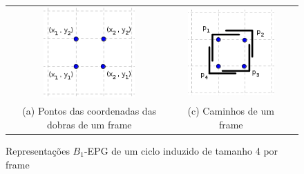 \begin{figure}[htb]
  \centering
  \begin{tabular}{c c c c c }
    \includegraphics[width=3.5cm]{./img/dispositionFrameInGrid.png}    
    & &
 \includegraphics[width=3.5cm]{./img/frameInGrid.png} \\%
    {\footnotesize (a) Pontos das coordenadas das dobras de um frame}  
    & & {\footnotesize (c) Caminhos de um frame} %
  \end{tabular}
  \caption{Representações $B_{1}$-EPG de um ciclo induzido de tamanho 4 por frame} \label{fig:frameInGrid}
\end{figure} 